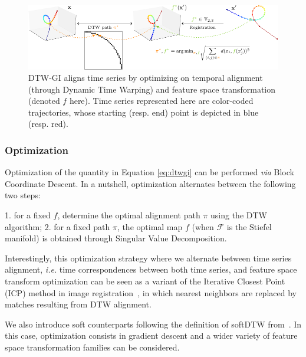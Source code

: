 \begin{figure}[t]
    \includegraphics[width=\linewidth]{fig/dtw_gi_cropped}
    \caption{DTW-GI aligns time series by optimizing on temporal alignment
    (through Dynamic Time Warping) and feature space transformation (denoted
    $f$ here). Time series represented here are color-coded trajectories, whose
    starting (resp. end) point is depicted in blue (resp. red).}
    \label{fig:dtw-gi}
\end{figure}



\subsubsection{Optimization}

Optimization of the quantity in Equation \eqref{eq:dtwgi} can be performed
\emph{via} Block Coordinate Descent.
In a nutshell, optimization alternates between the following two steps:

1. for a fixed $f$, determine the optimal alignment path $\pi$ using the DTW
algorithm;
2. for a fixed path $\pi$, the optimal map $f$ (when $\mathcal{F}$ is the
Stiefel manifold) is obtained through Singular Value Decomposition.

Interestingly, this optimization strategy where we alternate between time
series alignment, \emph{i.e.} time correspondences between both time series, and
feature space transform optimization can be seen as a variant of the Iterative
Closest Point (ICP) method in image registration~\cite{CHEN1992145}, in
which  nearest neighbors are replaced by matches resulting from DTW alignment.

We also introduce soft counterparts following the definition of softDTW
from~\cite{cuturi2017soft}.
In this case, optimization consists in gradient descent and a wider variety of
feature space transformation families can be considered.


